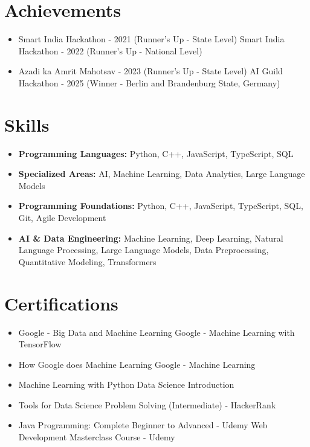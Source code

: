 \documentclass[a4paper,10pt]{article}
\begin{document}
\section*{Achievements}
\begin{itemize}
\item Smart India Hackathon - 2021 (Runner's Up - State Level) \hfill Smart India Hackathon - 2022 (Runner's Up - National Level)
\item Azadi ka Amrit Mahotsav - 2023 (Runner's Up - State Level) \hfill AI Guild Hackathon - 2025 (Winner - Berlin and Brandenburg State, Germany)
\end{itemize}

\section*{Skills}
\begin{itemize}
  \item \textbf{Programming Languages:} Python, C++, JavaScript, TypeScript, SQL
  \item \textbf{Specialized Areas:} AI, Machine Learning, Data Analytics, Large Language Models
  \item \textbf{Programming Foundations:} Python, C++, JavaScript, TypeScript, SQL, Git, Agile Development
  \item \textbf{AI \& Data Engineering:} Machine Learning, Deep Learning, Natural Language Processing, Large Language Models, Data Preprocessing, Quantitative Modeling, Transformers
\end{itemize}

\section*{Certifications}
\begin{itemize}
\item Google - Big Data and Machine Learning \hfill Google - Machine Learning with TensorFlow
\item How Google does Machine Learning \hfill Google - Machine Learning
\item Machine Learning with Python \hfill Data Science Introduction
\item Tools for Data Science \hfill Problem Solving (Intermediate) - HackerRank
\item Java Programming: Complete Beginner to Advanced - Udemy \hfill Web Development Masterclass Course - Udemy
\end{itemize}
\end{document}

